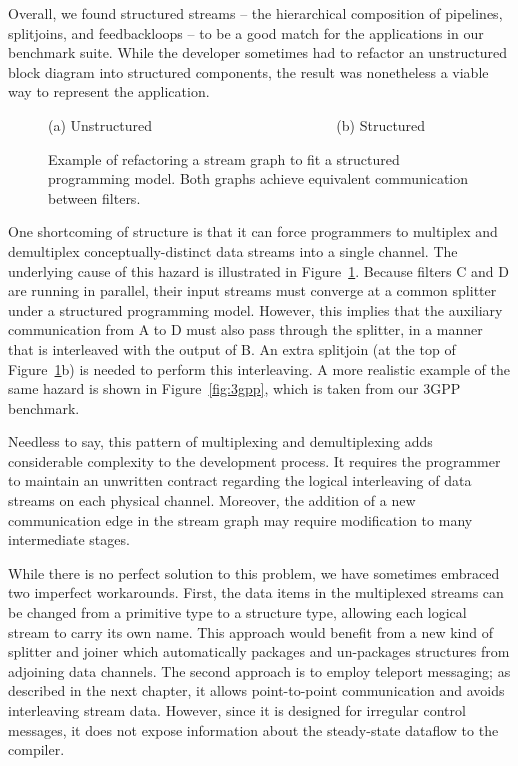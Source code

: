 \mybegin

  Overall, we found structured streams --
  the hierarchical composition of pipelines, splitjoins, and
  feedbackloops -- to be a good match for the applications in our
  benchmark suite.  While the developer sometimes had to refactor an
  unstructured block diagram into structured components, the result
  was nonetheless a viable way to represent the application.

\begin{figure}[t]
\centering
{}

(a) Unstructured ~~~~~~~~~~~~~~~~~~~~~~~~~ (b) Structured~~~~~~
\caption[Refactoring a stream graph to fit a structured programming
  model.]{Example of refactoring a stream graph to fit a structured
  programming model.  Both graphs achieve equivalent communication
  between filters.
\protect\label{fig:interleaving}}
\end{figure}

  One shortcoming of structure is that it can force programmers to
  multiplex and demultiplex conceptually-distinct data streams into a
  single channel.  The underlying cause of this hazard is illustrated
  in Figure~\ref{fig:interleaving}.  Because filters C and D are
  running in parallel, their input streams must converge at a common
  splitter under a structured programming model.  However, this
  implies that the auxiliary communication from A to D must also pass
  through the splitter, in a manner that is interleaved with the
  output of B.  An extra splitjoin (at the top of
  Figure~\ref{fig:interleaving}b) is needed to perform this
  interleaving.  A more realistic example of the same hazard is shown
  in Figure~\ref{fig:3gpp}, which is taken from our 3GPP benchmark.

  Needless to say, this pattern of multiplexing and demultiplexing
  adds considerable complexity to the development process.  It
  requires the programmer to maintain an unwritten contract regarding
  the logical interleaving of data streams on each physical channel.
  Moreover, the addition of a new communication edge in the stream
  graph may require modification to many intermediate stages.

  While there is no perfect solution to this problem, we have
  sometimes embraced two imperfect workarounds.  First, the data items
  in the multiplexed streams can be changed from a primitive type to a
  structure type, allowing each logical stream to carry its own name.
  This approach would benefit from a new kind of splitter and joiner
  which automatically packages and un-packages structures from
  adjoining data channels.  The second approach is to employ teleport
  messaging; as described in the next chapter, it allows
  point-to-point communication and avoids interleaving stream data.
  However, since it is designed for irregular control messages, it
  does not expose information about the steady-state dataflow to the
  compiler.

